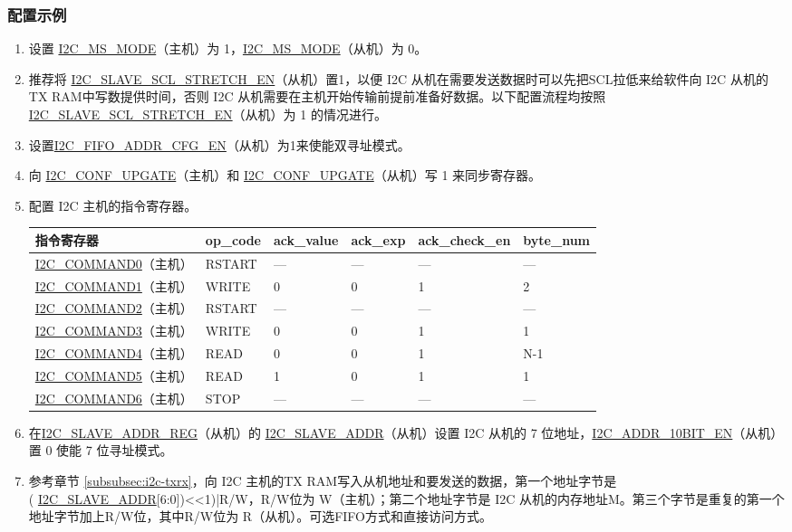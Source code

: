\documentclass[main\_\_CN.tex]{subfiles}
\begin{document}
\subsubsection{配置示例}
\begin{enumerate}
\item 设置 \hyperref[fielddesc:I2CMSMODE]{I2C\_MS\_MODE}（主机）为 1，\hyperref[fielddesc:I2CMSMODE]{I2C\_MS\_MODE}（从机）为 0。
\item 推荐将 \hyperref[fielddesc:I2CSLAVESCLSTRETCHEN]{I2C\_SLAVE\_SCL\_STRETCH\_EN}（从机）置1，以便 I2C 从机在需要发送数据时可以先把SCL拉低来给软件向 I2C 从机的TX RAM中写数提供时间，否则 I2C 从机需要在主机开始传输前提前准备好数据。以下配置流程均按照\hyperref[fielddesc:I2CSLAVESCLSTRETCHEN]{I2C\_SLAVE\_SCL\_STRETCH\_EN}（从机）为 1 的情况进行。 
\item 设置\hyperref[fielddesc:I2CFIFOADDRCFGEN]{I2C\_FIFO\_ADDR\_CFG\_EN}（从机）为1来使能双寻址模式。
\item 向 \hyperref[fielddesc:I2CCONFUPGATE]{I2C\_CONF\_UPGATE}（主机）和 \hyperref[fielddesc:I2CCONFUPGATE]{I2C\_CONF\_UPGATE}（从机）写 1 来同步寄存器。
\item 配置 I2C 主机的指令寄存器。
\begin{longtable}{ | p{4cm} | p{2cm} | p{2cm} | p{2cm} |p{2cm} | p{2cm} |}
\hline\rowcolor{lightgray}
指令寄存器& op\_code & ack\_value&ack\_exp&ack\_check\_en&byte\_num  \\ \hline
\hyperref[fielddesc:I2CCOMMAND0]{I2C\_COMMAND0}（主机）& RSTART& ---&---&---&---  \\ \hline
\hyperref[fielddesc:I2CCOMMAND1]{I2C\_COMMAND1}（主机）& WRITE& 0&0&1&2  \\ \hline
\hyperref[fielddesc:I2CCOMMAND2]{I2C\_COMMAND2}（主机）& RSTART& ---&---&---&---  \\ \hline
\hyperref[fielddesc:I2CCOMMAND3]{I2C\_COMMAND3}（主机）& WRITE& 0&0&1&1  \\ \hline
\hyperref[fielddesc:I2CCOMMAND4]{I2C\_COMMAND4}（主机）& READ& 0&0&1&N-1  \\ \hline
\hyperref[fielddesc:I2CCOMMAND5]{I2C\_COMMAND5}（主机）& READ& 1&0&1&1  \\ \hline
\hyperref[fielddesc:I2CCOMMAND6]{I2C\_COMMAND6}（主机）& STOP& ---&---&---&---  \\ \hline
\end{longtable}

\item 在\hyperref[regdesc:I2CSLAVEADDRREG]{I2C\_SLAVE\_ADDR\_REG}（从机）的 \hyperref[fielddesc:I2CSLAVEADDR]{I2C\_SLAVE\_ADDR}（从机）设置 I2C 从机的 7 位地址，\hyperref[fielddesc:I2CADDR10BITEN]{I2C\_ADDR\_10BIT\_EN}（从机）置 0 使能 7 位寻址模式。
\item 参考章节 \ref{subsubsec:i2c-txrx}，向 I2C 主机的TX RAM写入从机地址和要发送的数据，第一个地址字节是 \\( \hyperref[fielddesc:I2CSLAVEADDR]{I2C\_SLAVE\_ADDR}[6:0])<<1)|R/W，R/W位为 W（主机）；第二个地址字节是 I2C 从机的内存地址M。第三个字节是重复的第一个地址字节加上R/W位，其中R/W位为 R（从机）。可选FIFO方式和直接访问方式。


\end{enumerate}
\end{document}
